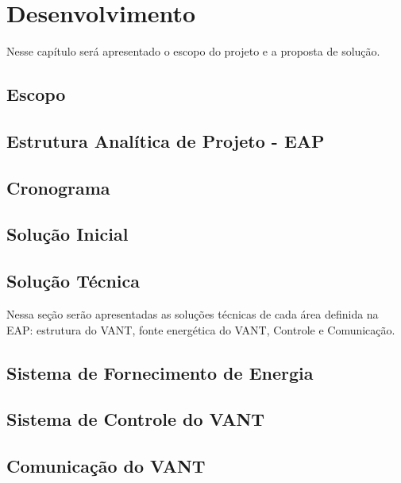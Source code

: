 \chapter{Desenvolvimento}\label{cap2}
 Nesse capítulo será apresentado o escopo do projeto e a proposta de solução.

 \section{Escopo}
  

\section{Estrutura Analítica de Projeto - EAP}
  
 
\section{Cronograma}
  

\section{Solução Inicial}
  

\section{Solução Técnica}
  Nessa seção serão apresentadas as soluções técnicas de cada área definida na EAP: estrutura do VANT,
  fonte energética do VANT, Controle e Comunicação.

%   
  
\section{Sistema de Fornecimento de Energia}
  

\section{Sistema de Controle do VANT}
  

\section{Comunicação do VANT}
  
